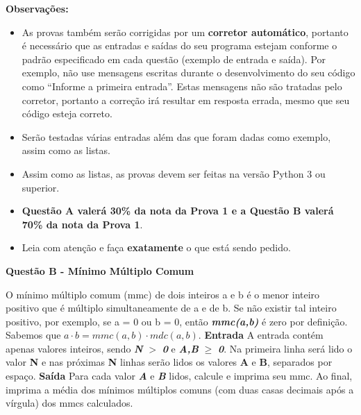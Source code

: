 \documentclass[a4paper, 12pt]{article}
\begin{document}
\textbf{{\large Observações:}}
\begin{itemize}
	\item As provas também serão corrigidas por um \textbf{corretor automático}, portanto é necessário que as entradas e saídas do seu programa estejam conforme o padrão especificado em cada questão (exemplo de entrada e saída). Por exemplo, não use mensagens escritas durante o desenvolvimento do seu código como “Informe a primeira entrada”. Estas mensagens não são tratadas pelo corretor, portanto a correção irá resultar em resposta errada, mesmo que seu código esteja correto.
	\item Serão testadas várias entradas além das que foram dadas como exemplo, assim como as listas.
	\item Assim como as listas, as provas devem ser feitas na versão Python 3 ou superior.
	\item \textbf{Questão A valerá 30\% da nota da Prova 1 e a Questão B valerá 70\% da nota da Prova 1}.
	\item Leia com atenção e faça \textbf{exatamente} o que está sendo pedido.
\end{itemize}
\newpage %
\begin{center}
\textbf{{\Large Questão B - Mínimo Múltiplo Comum}}
\end{center}
\vspace{5pt}
O mínimo múltiplo comum (mmc) de dois inteiros a e b é o menor inteiro positivo que é múltiplo simultaneamente de a e de b. Se não existir tal inteiro positivo, por exemplo, se a = 0 ou b = 0, então \textit{\textbf{mmc(a,b)}} é zero por definição. Sabemos que $a\cdot b = mmc(a,b) \cdot mdc(a,b)$.
\newline \newline
\textbf{{\large Entrada}} \newline
A entrada contém apenas valores inteiros, sendo \textbf{\textit{N}} $>$ \textbf{\textit{0}} e \textbf{\textit{A,B}} $\geq$ \textbf{\textit{0}}. Na primeira linha será lido o valor \textbf{N} e nas próximas \textbf{N} linhas serão lidos os valores \textbf{A} e \textbf{B}, separados por espaço.
\newline \newline
\textbf{{\large Saída}} \newline
Para cada valor \textbf{\textit{A}} e \textbf{\textit{B}} lidos, calcule e imprima seu mmc. Ao final, imprima a média dos mínimos múltiplos comuns (com duas casas decimais após a vírgula) dos mmcs calculados.
\newline
\end{document}
